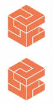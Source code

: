 \documentclass{article}
\begin{document}

\includegraphics[width=2cm,angle=45]{figures/cesium.png}

\begin{center}
\includegraphics[width=2cm]{figures/cesium.png}
\end{center}
\end{document}
